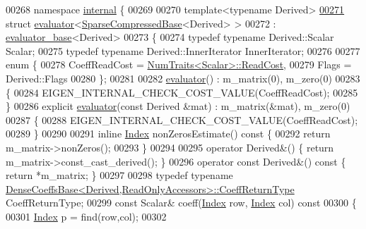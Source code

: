\begin{DoxyCode}
00268 \textcolor{keyword}{namespace }\hyperlink{namespaceinternal}{internal} \{
00269 
00270 \textcolor{keyword}{template}<\textcolor{keyword}{typename} Derived>
\hyperlink{struct_eigen_1_1internal_1_1evaluator_3_01_sparse_compressed_base_3_01_derived_01_4_01_4}{00271} \textcolor{keyword}{struct }\hyperlink{struct_eigen_1_1internal_1_1evaluator}{evaluator}<\hyperlink{group___sparse_core___module_class_eigen_1_1_sparse_compressed_base}{SparseCompressedBase}<Derived> >
00272   : \hyperlink{struct_eigen_1_1internal_1_1evaluator__base}{evaluator\_base}<Derived>
00273 \{
00274   \textcolor{keyword}{typedef} \textcolor{keyword}{typename} Derived::Scalar Scalar;
00275   \textcolor{keyword}{typedef} \textcolor{keyword}{typename} Derived::InnerIterator InnerIterator;
00276   
00277   \textcolor{keyword}{enum} \{
00278     CoeffReadCost = \hyperlink{group___core___module_struct_eigen_1_1_num_traits}{NumTraits<Scalar>::ReadCost},
00279     Flags = Derived::Flags
00280   \};
00281   
00282   \hyperlink{struct_eigen_1_1internal_1_1evaluator}{evaluator}() : m\_matrix(0), m\_zero(0)
00283   \{
00284     EIGEN\_INTERNAL\_CHECK\_COST\_VALUE(CoeffReadCost);
00285   \}
00286   \textcolor{keyword}{explicit} \hyperlink{struct_eigen_1_1internal_1_1evaluator}{evaluator}(\textcolor{keyword}{const} Derived &mat) : m\_matrix(&mat), m\_zero(0)
00287   \{
00288     EIGEN\_INTERNAL\_CHECK\_COST\_VALUE(CoeffReadCost);
00289   \}
00290   
00291   \textcolor{keyword}{inline} \hyperlink{namespace_eigen_a62e77e0933482dafde8fe197d9a2cfde}{Index} nonZerosEstimate()\textcolor{keyword}{ const }\{
00292     \textcolor{keywordflow}{return} m\_matrix->nonZeros();
00293   \}
00294   
00295   \textcolor{keyword}{operator} Derived&() \{ \textcolor{keywordflow}{return} m\_matrix->const\_cast\_derived(); \}
00296   \textcolor{keyword}{operator} \textcolor{keyword}{const} Derived&() \textcolor{keyword}{const} \{ \textcolor{keywordflow}{return} *m\_matrix; \}
00297   
00298   \textcolor{keyword}{typedef} \textcolor{keyword}{typename} \hyperlink{class_eigen_1_1_dense_coeffs_base}{DenseCoeffsBase<Derived,ReadOnlyAccessors>::CoeffReturnType}
       CoeffReturnType;
00299   \textcolor{keyword}{const} Scalar& coeff(\hyperlink{namespace_eigen_a62e77e0933482dafde8fe197d9a2cfde}{Index} row, \hyperlink{namespace_eigen_a62e77e0933482dafde8fe197d9a2cfde}{Index} col)\textcolor{keyword}{ const}
00300 \textcolor{keyword}{  }\{
00301     \hyperlink{namespace_eigen_a62e77e0933482dafde8fe197d9a2cfde}{Index} p = find(row,col);
00302 

\end{DoxyCode}
